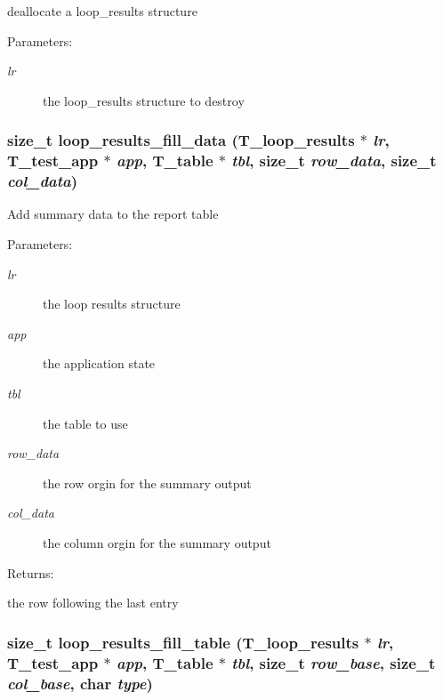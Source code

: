 deallocate a loop\_\-results structure

\begin{Desc}
\item[Parameters: ]\par
\begin{description}
\item[{\em 
lr}]the loop\_\-results structure to destroy \end{description}
\end{Desc}
\subsubsection{\setlength{\rightskip}{0pt plus 5cm}size\_\-t loop\_\-results\_\-fill\_\-data ({\bf T\_\-loop\_\-results} $\ast$ {\em lr}, {\bf T\_\-test\_\-app} $\ast$ {\em app}, {\bf T\_\-table} $\ast$ {\em tbl}, size\_\-t {\em row\_\-data}, size\_\-t {\em col\_\-data})}\label{group__loop__test_a18}


Add summary data to the report table \begin{Desc}
\item[Parameters: ]\par
\begin{description}
\item[{\em 
lr}]the loop results structure \item[{\em 
app}]the application state \item[{\em 
tbl}]the table to use \item[{\em 
row\_\-data}]the row orgin for the summary output \item[{\em 
col\_\-data}]the column orgin for the summary output \end{description}
\end{Desc}
\begin{Desc}
\item[Returns: ]\par
the row following the last entry \end{Desc}
\subsubsection{\setlength{\rightskip}{0pt plus 5cm}size\_\-t loop\_\-results\_\-fill\_\-table ({\bf T\_\-loop\_\-results} $\ast$ {\em lr}, {\bf T\_\-test\_\-app} $\ast$ {\em app}, {\bf T\_\-table} $\ast$ {\em tbl}, size\_\-t {\em row\_\-base}, size\_\-t {\em col\_\-base}, char {\em type})}\label{group__loop__test_a15}


